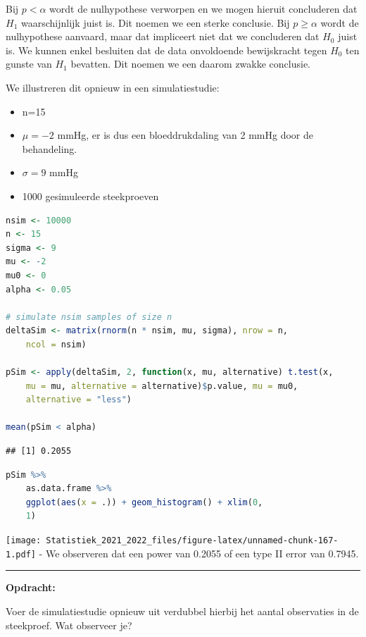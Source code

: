 \documentclass[
  12pt,dutch,coursenotes]{book}
\providecommand{\tightlist}{%
  \setlength{\itemsep}{0pt}\setlength{\parskip}{0pt}}
\theoremstyle{definition}
\theoremstyle{definition}
\theoremstyle{definition}
\theoremstyle{definition}
\theoremstyle{remark}
\begin{document}
Bij \(p < \alpha\) wordt de nulhypothese verworpen en we mogen hieruit concluderen dat \(H_1\) waarschijnlijk juist is. Dit noemen we een sterke conclusie.
Bij \(p\geq \alpha\) wordt de nulhypothese aanvaard, maar dat impliceert niet dat we concluderen dat \(H_0\) juist is. We kunnen enkel besluiten dat de data onvoldoende bewijskracht tegen \(H_0\) ten gunste van \(H_1\) bevatten. Dit noemen we een daarom zwakke conclusie.

We illustreren dit opnieuw in een simulatiestudie:

\begin{itemize}
\tightlist
\item
  n=15
\item
  \(\mu=-2\) mmHg, er is dus een bloeddrukdaling van 2 mmHg door de behandeling.
\item
  \(\sigma =9\) mmHg
\item
  1000 gesimuleerde steekproeven
\end{itemize}

\begin{lstlisting}[language=R]
nsim <- 10000
n <- 15
sigma <- 9
mu <- -2
mu0 <- 0
alpha <- 0.05

# simulate nsim samples of size n
deltaSim <- matrix(rnorm(n * nsim, mu, sigma), nrow = n,
    ncol = nsim)

pSim <- apply(deltaSim, 2, function(x, mu, alternative) t.test(x,
    mu = mu, alternative = alternative)$p.value, mu = mu0,
    alternative = "less")

mean(pSim < alpha)
\end{lstlisting}

\begin{lstlisting}
## [1] 0.2055
\end{lstlisting}

\begin{lstlisting}[language=R]
pSim %>%
    as.data.frame %>%
    ggplot(aes(x = .)) + geom_histogram() + xlim(0,
    1)
\end{lstlisting}

\texttt{[image: Statistiek\_2021\_2022\_files/figure-latex/unnamed-chunk-167-1.pdf]}
- We observeren dat een power van 0.2055 of een type II error van 0.7945.

\begin{center}\rule{0.5\linewidth}{0.5pt}\end{center}

\textbf{Opdracht:}

Voer de simulatiestudie opnieuw uit verdubbel hierbij het aantal observaties in de steekproef. Wat observeer je?
\end{document}
